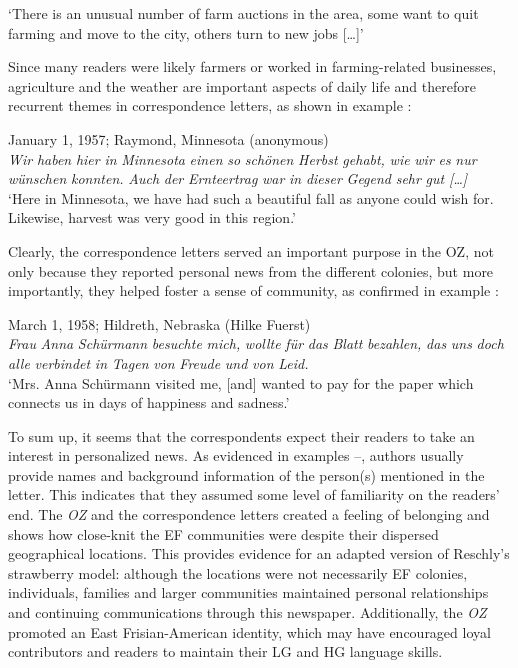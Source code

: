 \documentclass[output=paper]{langsci/langscibook}
\begin{document}
‘There is an unusual number of farm auctions in the area, some want to quit farming and  move to the city, others turn to new jobs […]’
\z

Since many readers were likely farmers or worked in farming-related businesses, agriculture and the weather are important aspects of daily life and therefore recurrent themes in correspondence letters, as shown in example :

  
\ea
\label{ex:rocker:9}
January 1, 1957; Raymond, Minnesota (anonymous)\\

\textit{Wir} \textit{haben} \textit{hier} \textit{in} \textit{Minnesota} \textit{einen} \textit{so} \textit{schönen} \textit{Herbst} \textit{gehabt,} \textit{wie} \textit{wir} \textit{es} \textit{nur} \textit{wünschen}  \textit{konnten.} \textit{Auch} \textit{der} \textit{Ernteertrag} \textit{war} \textit{in} \textit{dieser} \textit{Gegend} \textit{sehr} \textit{gut} \textit{[…]}\\

‘Here in Minnesota, we have had such a beautiful fall as anyone could wish for. Likewise, harvest was very good in this region.’
\z

Clearly, the correspondence letters served an important purpose in the OZ, not only because they reported personal news from the different colonies, but more importantly, they helped foster a sense of community, as confirmed in example : 

  
 \ea
\label{ex:rocker:10}
March 1, 1958; Hildreth, Nebraska (Hilke Fuerst)\\
  
\textit{Frau} \textit{Anna} \textit{Schürmann} \textit{besuchte} \textit{mich,} \textit{wollte} \textit{für} \textit{das} \textit{Blatt} \textit{bezahlen,} \textit{das} \textit{uns} \textit{doch} \textit{alle}  \textit{verbindet} \textit{in} \textit{Tagen} \textit{von} \textit{Freude} \textit{und} \textit{von} \textit{Leid.}\\

‘Mrs. Anna Schürmann visited me, [and] wanted to pay for the paper which connects us in days of happiness and sadness.’ 
\z

To sum up, it seems that the correspondents expect their readers to take an interest in personalized news. As evidenced in examples --, authors usually provide names and background information of the person(s) mentioned in the letter. This indicates that they assumed some level of familiarity on the readers’ end. The \textit{OZ} and the correspondence letters created a feeling of belonging and shows how close-knit the EF communities were despite their dispersed geographical locations. This provides evidence for an adapted version of Reschly’s strawberry model: although the locations were not necessarily EF colonies, individuals, families and larger communities maintained personal relationships and continuing communications through this newspaper. Additionally, the \textit{OZ} promoted an East Frisian-American identity, which may have encouraged loyal contributors and readers to maintain their LG and HG language skills.
\end{document}
